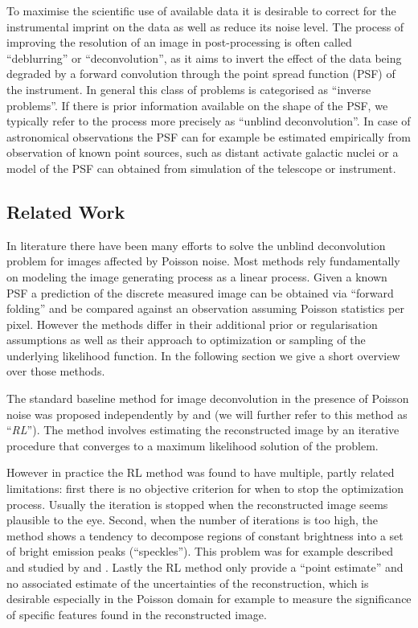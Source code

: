 \documentclass[twocolumn]{aastex631}
\begin{document}
    To maximise the scientific use of available data it is desirable to correct for the instrumental imprint on the data as well as reduce its noise level. The process of improving the resolution of an image in post-processing is often called \enquote{deblurring} or \enquote{deconvolution}, as it aims to invert the effect of the data being degraded by a forward convolution through the point spread function (PSF) of the instrument. In general this class of problems is categorised as \enquote{inverse problems}. If there is prior information available on the shape of the PSF, we typically refer to the process more precisely as \enquote{unblind deconvolution}. In case of astronomical observations the PSF can for example be estimated empirically from observation of known point sources, such as distant activate galactic nuclei or a model of the PSF can obtained from simulation of the telescope or instrument.

    \subsection{Related Work}
    In literature there have been many efforts to solve the unblind deconvolution problem for images affected by Poisson noise. Most methods rely fundamentally on modeling the image generating process as a linear process. Given a known PSF a prediction of the discrete measured image can be obtained via \enquote{forward folding} and be compared against an observation assuming Poisson statistics per pixel. However the methods differ in their additional prior or regularisation assumptions as well as their approach to optimization or sampling of the underlying likelihood function. In the following section we give a short overview over those methods.
    
    The standard baseline method for image deconvolution in the presence of Poisson noise was proposed independently by \cite{Richardson1972} and \cite{Lucy1974} (we will further refer to this method as \enquote{\textit{RL}}). The method involves estimating the reconstructed image by an iterative procedure that converges to a maximum likelihood solution of the problem.
    
    However in practice the RL method was found to have multiple, partly related limitations: first there is no objective criterion for when to stop the optimization process. Usually the iteration is stopped when the reconstructed image seems plausible to the eye. Second, when the number of iterations is too high, the method shows a tendency to decompose regions of constant brightness into a set of bright emission peaks (\enquote{speckles}). This problem was for example described and studied by \cite{Reeves1995} and \cite{Fish1995}. Lastly the RL method only provide a \enquote{point estimate} and no associated estimate of the uncertainties of the reconstruction, which is desirable especially in the Poisson domain for example to measure the significance of specific features found in the reconstructed image.
    
\end{document}
